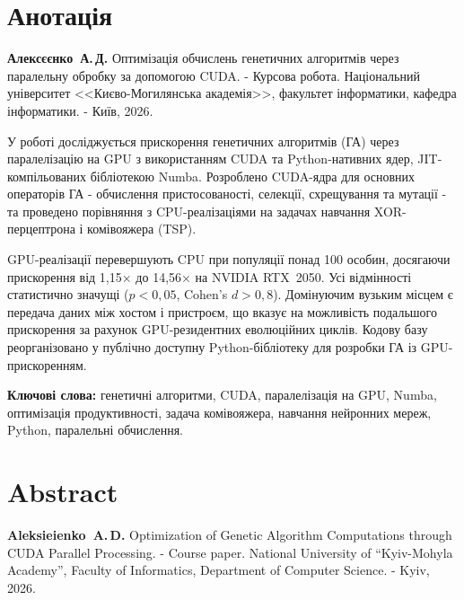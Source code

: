 \newpage

\tableofcontents
\newpage

{}

\section*{Анотація}

\textbf{Алексєєнко~А.\,Д.} Оптимізація обчислень генетичних алгоритмів через паралельну обробку за допомогою CUDA. - Курсова робота. Національний університет <<Києво-Могилянська академія>>, факультет інформатики, кафедра інформатики. - Київ, 2026.

\bigskip
У роботі досліджується прискорення генетичних алгоритмів (ГА) через паралелізацію на GPU з використанням CUDA та Python-нативних ядер, JIT-компільованих бібліотекою Numba. Розроблено CUDA-ядра для основних операторів ГА - обчислення пристосованості, селекції, схрещування та мутації - та проведено порівняння з CPU-реалізаціями на задачах навчання XOR-перцептрона і комівояжера (TSP).

GPU-реалізації перевершують CPU при популяції понад 100 особин, досягаючи прискорення від 1,15$\times$ до 14,56$\times$ на NVIDIA RTX~2050. Усі відмінності статистично значущі ($p < 0{,}05$, Cohen's $d > 0{,}8$). Домінуючим вузьким місцем є передача даних між хостом і пристроєм, що вказує на можливість подальшого прискорення за рахунок GPU-резидентних еволюційних циклів. Кодову базу реорганізовано у публічно доступну Python-бібліотеку для розробки ГА із GPU-прискоренням.

\bigskip
\textbf{Ключові слова:} генетичні алгоритми, CUDA, паралелізація на GPU, Numba, оптимізація продуктивності, задача комівояжера, навчання нейронних мереж, Python, паралельні обчислення.

\newpage

{}

\section*{Abstract}

\textbf{Aleksieienko~A.\,D.} Optimization of Genetic Algorithm Computations through CUDA Parallel Processing. - Course paper. National University of ``Kyiv-Mohyla Academy'', Faculty of Informatics, Department of Computer Science. - Kyiv, 2026.

